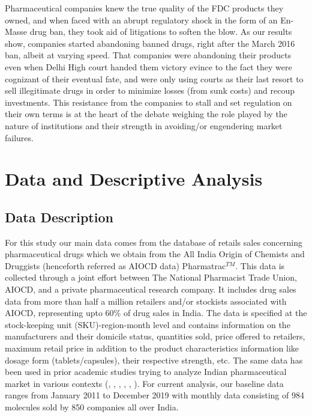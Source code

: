\documentclass[AER]{AEA}
\theoremstyle{theorem}
\begin{document}
Pharmaceutical companies knew the true quality of the FDC products they owned, and when faced with an abrupt regulatory shock in the form of an En-Masse drug ban, they took aid of litigations to soften the blow. As our results show, companies started abandoning banned drugs, right after the March 2016 ban, albeit at varying speed. That companies were abandoning their products even when Delhi High court handed them victory  evince to the fact they were cognizant of their eventual fate, and were only using courts as their last resort to sell illegitimate drugs in order to minimize losses (from sunk costs) and recoup investments. This resistance from the companies to stall and set regulation on their own terms is at the heart of the debate weighing the role played by the nature of institutions and their strength in avoiding/or engendering market failures.

\section{Data and Descriptive Analysis}

\subsection{Data Description}

For this study our main data comes from the database of retails sales concerning pharmaceutical drugs which we obtain from the All India Origin of Chemists and Druggists (henceforth referred as AIOCD data) Pharmatrac$^{TM}$. This data is collected through a joint effort between The National Pharmacist Trade Union, AIOCD, and a private pharmaceutical research company. It includes drug sales data from more than half a million retailers and/or stockists associated with AIOCD, representing upto 60\% of drug sales in India. The data is specified at the stock-keeping unit (SKU)-region-month level and contains information on the manufacturers and their domicile status, quantities sold, price offered to retailers, maximum retail price in addition to the product characteristics information like dosage form (tablets/capsules), their respective strength, etc. The same data has been used in prior academic studies trying to analyze Indian pharmaceutical market in various contexts (\cite{dutta2011free}, \cite{bhaskarabhatla2017role}, \cite{adbi2020stakeholder}, \cite{aggarwal2020can}, \cite{aggarwal2020science},  \cite{bansal2021politics}). For current analysis, our baseline data ranges from January 2011 to December 2019 with monthly data consisting of 984 molecules sold by 850 companies all over India.
\end{document}
